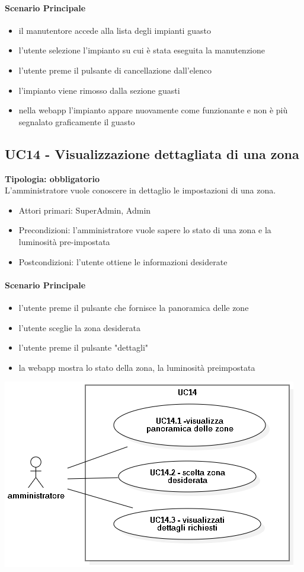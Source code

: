 \documentclass[12pt]{article}
\begin{document}
\paragraph{Scenario Principale}
\begin{itemize}
	\item il manutentore accede alla lista degli impianti guasto
	\item l'utente selezione l'impianto su cui è stata eseguita la manutenzione
	\item l'utente preme il pulsante di cancellazione dall'elenco
	\item l'impianto viene rimosso dalla sezione guasti
	\item nella webapp l'impianto appare nuovamente come funzionante e non è più segnalato graficamente il guasto
\end{itemize}


\subsection{UC14 - Visualizzazione dettagliata di una zona}
\textbf{Tipologia: obbligatorio} \\
L'amministratore vuole conoscere in dettaglio le impostazioni di una zona.
\begin{itemize}
	\item Attori primari: SuperAdmin, Admin
	\item Precondizioni: l'amministratore vuole sapere lo stato di una zona e la luminosità pre-impostata
	\item Postcondizioni: l'utente ottiene le informazioni desiderate
\end{itemize}
\paragraph{Scenario Principale}
\begin{itemize}
	\item l'utente preme il pulsante che fornisce la panoramica delle zone
	\item l'utente sceglie la zona desiderata
	\item l'utente preme il pulsante "dettagli"
	\item la webapp mostra lo stato della zona, la luminosità preimpostata
\end{itemize}

\includegraphics[scale=0.5]{UC14.png}
\end{document}

